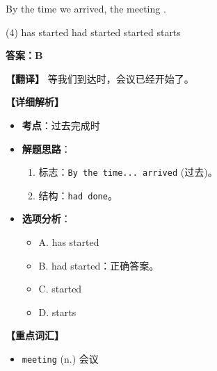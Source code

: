 \documentclass[11pt, a4paper]{article}
\newcommand{\analysis}[4]{
    \begin{solutionbox}
        \textbf{答案：#1}
        
        \textbf{【翻译】} #2
        
        \textbf{【详细解析】}
        #3
        
        \textbf{【重点词汇】}
        #4
    \end{solutionbox}
}
\newcommand{\blank}{\underline{\hspace{1.5cm}}}
\begin{document}
\begin{questions}
    \item By the time we arrived, the meeting \blank.
    \begin{tasks}(4)
        \task has started \task had started \task started \task starts
    \end{tasks}
    \analysis{B}{等我们到达时，会议已经开始了。}{
        \begin{itemize}
            \item \textbf{考点}：过去完成时
            \item \textbf{解题思路}：
                \begin{enumerate}
                    \item 标志：\texttt{By the time... arrived} (过去)。
                    \item 结构：\texttt{had done}。
                \end{enumerate}
            \item \textbf{选项分析}：
                \begin{itemize}
                    \item A. has started
                    \item B. had started：正确答案。
                    \item C. started
                    \item D. starts
                \end{itemize}
        \end{itemize}
    }{
        \begin{itemize}
            \item \texttt{meeting} (n.) 会议
        \end{itemize}
    }


\end{questions}
\end{document}
